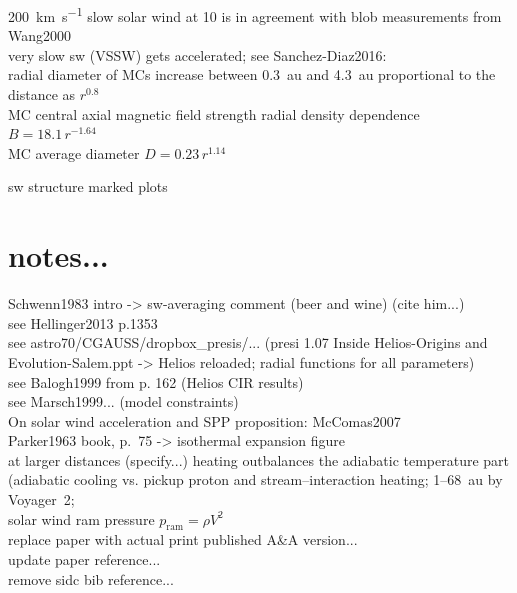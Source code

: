 \SI{200}{\km\per\s} slow solar wind at \SI{10}{\Rs} is in agreement with blob measurements from Wang2000\\

very slow sw (VSSW) gets accelerated; see Sanchez-Diaz2016:\\


radial diameter of MCs increase between 0.3~au and 4.3~au proportional to the distance as $r^{0.8}$ \citep{Bothmer1998}\\
MC central axial magnetic field strength radial density dependence $B = 18.1\,r^{-1.64}$ \citet{Leitner2007}\\
MC average diameter $D = 0.23\,r^{1.14}$ \citet{Leitner2007}

sw structure marked plots\\


\section{notes...}

Schwenn1983 intro -> sw-averaging comment (beer and wine) (cite him...)\\
see Hellinger2013 p.1353\\
see astro70/CGAUSS/dropbox\_presis/... (presi 1.07 Inside Helios-Origins and Evolution-Salem.ppt -> Helios reloaded; radial functions for all parameters)\\
see Balogh1999 from p. 162 (Helios CIR results)\\
see Marsch1999... (model constraints)\\
On solar wind acceleration and SPP proposition: McComas2007\\
Parker1963 book, p.~75 -> isothermal expansion figure\\	%


at larger distances (specify...) heating outbalances the adiabatic temperature part (adiabatic cooling vs. pickup proton and stream--interaction heating; 1--68~au by Voyager~2; \citet{Richardson2003}\\
solar wind ram pressure $p_\text{ram} = \rho V^2$\\


replace paper with actual print published A\&A version...\\
update paper reference...\\
remove sidc bib reference...\\


\cleardoublepage
